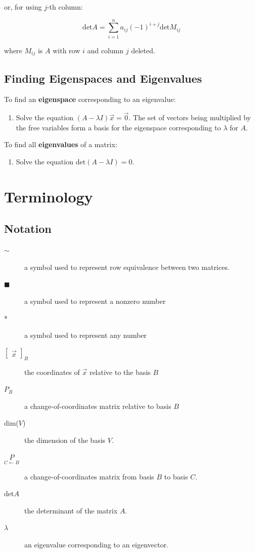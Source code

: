 \documentclass[a4paper,12pt]{article}
\theoremstyle{definition}
\theoremstyle{definition}
\newcommand{\basiscoord}[2]{
	\begin{bmatrix}
		\vec{#1}
	\end{bmatrix}_#2
}
\newcommand{\chngbasismat}[2]{
	\underset{#2 \leftarrow #1}{P}
}
\newcommand{\chareq}{\text{det}(A - \lambda I) = 0}
\begin{document}
	or, for using $j$-th column:
	
	\begin{equation*}
		\text{det}A = \sum_{i = 1}^{n}a_{ij}(-1)^{i + j}\text{det}M_{ij}
	\end{equation*}
	
	where $M_{ij}$ is $A$ with row $i$ and column $j$ deleted.
	
	\subsection{Finding Eigenspaces and Eigenvalues}
	\label{sec:finding-eigenspcs-and-eigenvals}
	To find an \textbf{eigenspace} corresponding to an eigenvalue:
	\begin{enumerate}
		\item Solve the equation $(A - \lambda I)\vec{x} = \vec{0}$. The set of vectors being multiplied by the free variables form a basis for the eigenspace corresponding to $\lambda$ for $A$.
	\end{enumerate}
	
	To find all \textbf{eigenvalues} of a matrix:
	\begin{enumerate}
		\item Solve the equation $\chareq$.
	\end{enumerate}
	\newpage
	
	\section{Terminology}
	\subsection{Notation}
	\begin{description}
		\item[$\sim$] a symbol used to represent row equivalence between two matrices.
		
		\item[$\blacksquare$] a symbol used to represent a nonzero number
		
		\item[*] a symbol used to represent any number
		
		\item[$\basiscoord{x}{B}$] the coordinates of $\vec{x}$ relative to the basis $B$
		
		\item[$P_B$] a change-of-coordinates matrix relative to basis $B$
		
		\item[dim($V$)] the dimension of the basis $V$.
		
		\item[$\chngbasismat{B}{C}$] a change-of-coordinates matrix from basis $B$ to basis $C$.
		
		\item[det$A$] the determinant of the matrix $A$.
		
		\item[$\lambda$] an eigenvalue corresponding to an eigenvector.
	\end{description}
	
\end{document}
